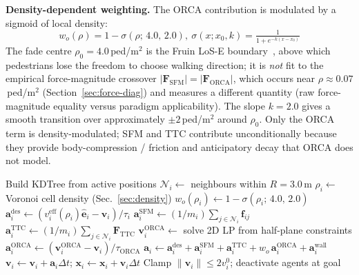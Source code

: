 \documentclass[a4paper,twoside]{article}
\begin{document}
\textbf{Density-dependent weighting.}
The ORCA contribution is modulated by a sigmoid of local density:
\begin{equation}\label{eq:sigmoid}
    w_o(\rho) = 1 - \sigma(\rho;\,4.0,\,2.0),\ \sigma(x;x_0,k)=\tfrac{1}{1+e^{-k(x-x_0)}}
\end{equation}
The fade centre $\rho_0=4.0$\,ped/m$^2$ is the Fruin LoS-E boundary~\cite{Fruin71}, above which pedestrians lose the freedom to choose walking direction; it is \emph{not} fit to the empirical force-magnitude crossover $|\mathbf{F}_{\mathrm{SFM}}|=|\mathbf{F}_{\mathrm{ORCA}}|$, which occurs near $\rho\approx 0.07$\,ped/m$^2$ (Section~\ref{sec:force-diag}) and measures a different quantity (raw force-magnitude equality versus paradigm applicability). The slope $k=2.0$ gives a smooth transition over approximately $\pm 2$\,ped/m$^2$ around $\rho_0$. Only the ORCA term is density-modulated; SFM and TTC contribute unconditionally because they provide body-compression / friction and anticipatory decay that ORCA does not model.

\begin{algorithm}[h]
\caption{One simulation timestep (density-modulated additive steering).}\label{alg:step}
\begin{algorithmic}[1]
\State Build KDTree from active positions
\State $\mathcal{N}_i \leftarrow$ neighbours within $R=3.0$\,m
\State $\rho_i \leftarrow$ Voronoi cell density (Sec.~\ref{sec:density})
\State $w_o(\rho_i) \leftarrow 1 - \sigma(\rho_i;\,4.0,\,2.0)$
\State $\mathbf{a}_i^{\text{des}} \leftarrow (v_i^{\text{eff}}(\rho_i)\hat{\mathbf{e}}_i - \mathbf{v}_i)/\tau_i$
\State $\mathbf{a}_i^{\text{SFM}} \leftarrow (1/m_i)\sum_{j\in\mathcal{N}_i}\mathbf{f}_{ij}$ 
\State $\mathbf{a}_i^{\text{TTC}} \leftarrow (1/m_i)\sum_{j\in\mathcal{N}_i}\mathbf{F}_{\text{TTC}}$ 
\State $\mathbf{v}_i^{\text{ORCA}} \leftarrow$ solve 2D LP from half-plane constraints
\State $\mathbf{a}_i^{\text{ORCA}} \leftarrow (\mathbf{v}_i^{\text{ORCA}}-\mathbf{v}_i)/\tau_{\text{ORCA}}$
\State $\mathbf{a}_i \leftarrow \mathbf{a}_i^{\text{des}} + \mathbf{a}_i^{\text{SFM}} + \mathbf{a}_i^{\text{TTC}} + w_o\,\mathbf{a}_i^{\text{ORCA}} + \mathbf{a}_i^{\text{wall}}$
\State $\mathbf{v}_i \leftarrow \mathbf{v}_i + \mathbf{a}_i\Delta t$; $\mathbf{x}_i \leftarrow \mathbf{x}_i + \mathbf{v}_i\Delta t$
\State Clamp $\|\mathbf{v}_i\|\le 2 v_i^0$; deactivate agents at goal
\end{algorithmic}
\end{algorithm}
\end{document}
